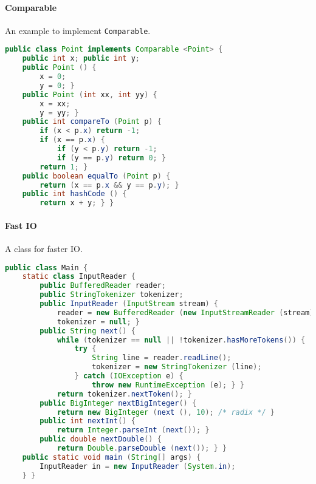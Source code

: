 \paragraph{Comparable}
An example to implement \texttt{Comparable}.
\begin{lstlisting}[language=java]
public class Point implements Comparable <Point> {
	public int x; public int y;
	public Point () {
		x = 0;
		y = 0; }
	public Point (int xx, int yy) {
		x = xx;
		y = yy; }
	public int compareTo (Point p) {
		if (x < p.x) return -1;
		if (x == p.x) {
			if (y < p.y) return -1;
			if (y == p.y) return 0; }
		return 1; }
	public boolean equalTo (Point p) {
		return (x == p.x && y == p.y); }
	public int hashCode () {
		return x + y; } }
\end{lstlisting}

\paragraph{Fast IO}
A class for faster IO.
\begin{lstlisting}[language=java]
public class Main {
	static class InputReader {
		public BufferedReader reader;
		public StringTokenizer tokenizer;
		public InputReader (InputStream stream) {
			reader = new BufferedReader (new InputStreamReader (stream), 32768);
			tokenizer = null; }
		public String next() {
			while (tokenizer == null || !tokenizer.hasMoreTokens()) {
				try {
					String line = reader.readLine();
					tokenizer = new StringTokenizer (line);
				} catch (IOException e) {
					throw new RuntimeException (e); } }
			return tokenizer.nextToken(); }
		public BigInteger nextBigInteger() {
			return new BigInteger (next (), 10); /* radix */ }
		public int nextInt() {
			return Integer.parseInt (next()); }
		public double nextDouble() {
			return Double.parseDouble (next()); } }
	public static void main (String[] args) {
		InputReader in = new InputReader (System.in);
	} }
\end{lstlisting}

